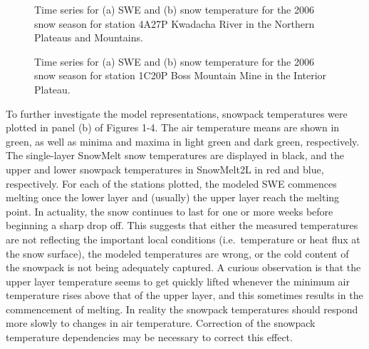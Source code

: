 \documentclass[12pt]{article}
\begin{document}
\begin{figure}
  \caption{Time series for (a) SWE and (b) snow temperature for the 2006 snow season for station 4A27P Kwadacha River in the Northern Plateaus and Mountains.}
  \label{fig:SM2L_2006_reg3}
\end{figure}

\begin{figure}
  \caption{Time series for (a) SWE and (b) snow temperature for the 2006 snow season for station 1C20P Boss Mountain Mine in the Interior Plateau.}
  \label{fig:SM2L_2006_reg2}
\end{figure}

To further investigate the model representations, snowpack temperatures were plotted in panel (b) of Figures 1-4.
The air temperature means are shown in green, as well as minima and maxima in light green and dark green, respectively.
The single-layer SnowMelt snow temperatures are displayed in black, and the upper and lower snowpack temperatures in SnowMelt2L in red and blue, respectively.
For each of the stations plotted, the modeled SWE commences melting once the lower layer and (usually) the upper layer reach the melting point.
In actuality, the snow continues to last for one or more weeks before beginning a sharp drop off.
This suggests that either the measured temperatures are not reflecting the important local conditions (i.e.\ temperature or heat flux at the snow surface), the modeled temperatures are wrong, or the cold content of the snowpack is not being adequately captured.
A curious observation is that the upper layer temperature seems to get quickly lifted whenever the minimum air temperature rises above that of the upper layer, and this sometimes results in the commencement of melting.
In reality the snowpack temperatures should respond more slowly to changes in air temperature.
Correction of the snowpack temperature dependencies may be necessary to correct this effect.
\end{document}
